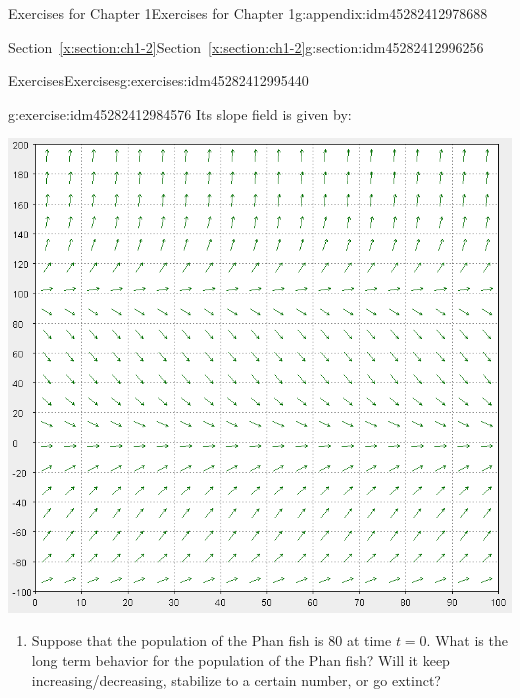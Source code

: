 \documentclass[oneside,10pt,]{book}
\numberwithin{equation}{section}
\numberwithin{equation}{section}
\begin{document}
\begin{appendixptx}{Exercises for Chapter 1}{}{Exercises for Chapter 1}{}{}{g:appendix:idm45282412978688}
\begin{sectionptx}{Section~\ref*{x:section:ch1-2}}{}{Section~\ref*{x:section:ch1-2}}{}{}{g:section:idm45282412996256}
\begin{exercises-subsection-numberless}{Exercises}{}{Exercises}{}{}{g:exercises:idm45282412995440}
\begin{divisionexercise}{3}{}{}{g:exercise:idm45282412984576}
Its slope field is given by: \begin{image}{0}{1}{0}%
\includegraphics[width=\linewidth]{images/1.2-3b.png}
\end{image}%
%
\begin{enumerate}[label=(\alph*)]
\item{}Suppose that the population of the Phan fish is \(80\) at time \(t=0\). What is the long term behavior for the population of the Phan fish? Will it keep increasing\slash{}decreasing, stabilize to a certain number, or go extinct?%
\end{enumerate}
\end{divisionexercise}%
\end{exercises-subsection-numberless}
\end{sectionptx}
\end{appendixptx}
%
%
\typeout{************************************************}
\typeout{************************************************}
%
\end{document}
